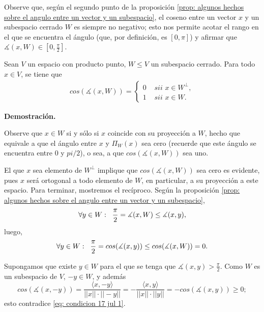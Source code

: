 \QEDB
\vspace{0.2cm}

\begin{nota}
\label{nota: sim coseno entre 0 y pi medios}
Observe que, según el segundo punto de la proposición 
\ref{prop: algunos hechos sobre el angulo entre un vector y un subespacio}, 
el coseno entre un vector $x$ y un subespacio cerrado $W$ es
siempre no negativo; esto nos permite acotar el rango en el que
se encuentra el ángulo (que, por definición, es $[0, \pi]$)
y afirmar que $\measuredangle(x, W) \in [0, \frac{\pi}{2}]$.
\end{nota}


\begin{prop}
Sean $V$ un espacio con producto punto, $W \leq V$ un subespacio
cerrado.  Para todo $x \in V$, se tiene que
\begin{align*}
cos(\measuredangle(x, W)) = \begin{cases}
0 & \textit{ sii } x \in W^{\perp}, \\
1 & \textit{ sii } x \in W.
\end{cases}
\end{align*}
\end{prop}
\noindent
\textbf{Demostración.}

Observe que $x \in W$ si y sólo si 
$x$ coincide con su proyección a $W$, hecho que equivale
a que el ángulo entre $x$ y $\Pi_{W}(x)$ sea cero (recuerde que
este ángulo se encuentra entre $0$ y $pi/2$), o sea, 
a que $cos(\measuredangle(x, W))$ sea uno.

El que $x$ sea elemento de $W^{\perp}$ implique 
que $cos(\measuredangle(x, W))$ sea cero es evidente, pues
$x$ será ortogonal a todo elemento de $W$, en particular,
a su proyección a este espacio.
Para terminar, mostremos el recíproco.
Según la proposición 
\ref{prop: algunos hechos sobre el angulo entre un vector y un subespacio},
\begin{equation}
\forall y \in W: \hspace{0.2cm}
\frac{\pi}{2} = \measuredangle(x, W) \leq  \measuredangle(x, y),
\end{equation}
luego, 
\begin{equation}
\label{eq: condicion 17 jul 1}
\forall y \in W: \hspace{0.2cm}
\frac{\pi}{2} = cos(\measuredangle(x, y)) \leq  cos(\measuredangle(x, W)) = 0.
\end{equation}

Supongamos que existe $y \in W$ para el que se tenga que 
$\measuredangle(x, y) > \frac{\pi}{2}$.
Como $W$ es un subespacio de $V$, $ -y \in W $, y además
\[
cos (\measuredangle(x, -y)) = \frac{
\langle x, -y \rangle 
}{||x|| \cdot ||-y||} =
-  \frac{
\langle x, y \rangle 
}{||x|| \cdot ||y||} = - cos (\measuredangle(x, y)) \geq 0;
\]
esto contradice \eqref{eq: condicion 17 jul 1}.

